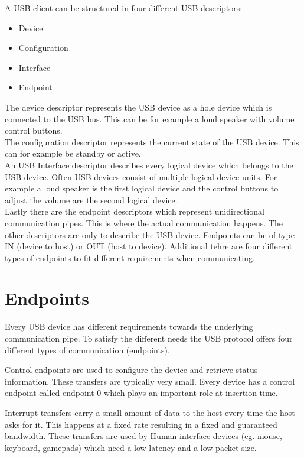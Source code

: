 A USB client can be structured in four different USB descriptors:

\begin{itemize}
\item Device
\item Configuration
\item Interface
\item Endpoint
\end{itemize}

The device descriptor represents the USB device as a hole device which is connected to the USB bus. This can be for example a loud speaker with volume control buttons.\\
The configuration descriptor represents the current state of the USB device. This can for example be standby or active.\\
An USB Interface descriptor describes every logical device which belongs to the USB device. Often USB devices consist of multiple logical device units. For example a loud speaker is the first logical device and the control buttons to adjust the volume are the second logical device.\\
Lastly there are the endpoint descriptors which represent unidirectional communication pipes. This is where the actual communication happens. The other descriptors are only to describe the USB device. Endpoints can be of type IN (device to host) or OUT (host to device). Additional tehre are four different types of endpoints to fit different requirements when communicating.\\

\section{Endpoints}

Every USB device has different requirements towards the underlying communication pipe. To satisfy the different needs the USB protocol offers four different types of communication (endpoints).

Control endpoints are used to configure the device and retrieve status information. These transfers are typically very small. Every device has a control endpoint called endpoint 0 which plays an important role at insertion time.

Interrupt transfers carry a small amount of data to the host every time the host asks for it. This happens at a fixed rate resulting in a fixed and guaranteed bandwidth. These transfers are used by Human interface devices (eg. mouse, keyboard, gamepads) which need a low latency and a low packet size.

